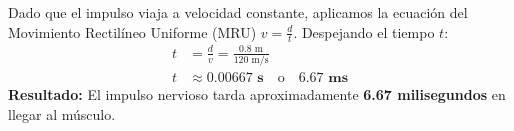 \documentclass[12pt]{article}
\begin{document}
\begin{tcolorbox}
\begin{center}
    \end{center}

    \vspace{0.4cm}
    \begin{tcolorbox}[colback=medteal!10, colframe=medteal, arc=2mm, boxrule=1.2pt, title=\textbf{Desarrollo Matemático y Solución}]
        Dado que el impulso viaja a velocidad constante, aplicamos la ecuación del Movimiento Rectilíneo Uniforme (MRU) $v = \frac{d}{t}$. Despejando el tiempo $t$:
        \begin{align*}
            t &= \frac{d}{v} = \frac{0.8 \text{ m}}{120 \text{ m/s}} \\[1ex]
            t &\approx \mathbf{0.00667 \text{ s}} \quad \text{o} \quad \mathbf{6.67 \text{ ms}}
        \end{align*}
        \textbf{Resultado:} El impulso nervioso tarda aproximadamente \textbf{6.67 milisegundos} en llegar al músculo.
    \end{tcolorbox}
    
\end{tcolorbox}
\end{document}
